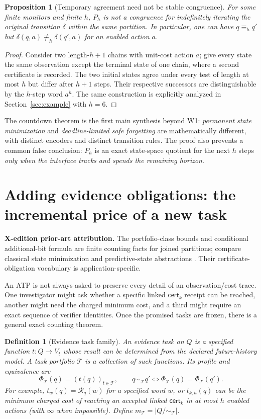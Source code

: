 \documentclass[11pt,letterpaper]{article}
\newcommand{\PriorArtNote}[1]{%
\par\smallskip\noindent\begin{minipage}{\linewidth}\small\color{black!85}%
\textbf{X-edition prior-art attribution.} #1\end{minipage}\par\smallskip}
\newtheorem{proposition}[theorem]{Proposition}
\newtheorem{definition}[theorem]{Definition}
\newcommand{\calT}{\mathcal{T}}
\newcommand{\cert}{\mathsf{cert}}
\newcommand{\R}{\mathcal{R}}
\newcommand{\eqk}[1]{\equiv_{#1}}
\begin{document}
\begin{proposition}[Temporary agreement need not be stable congruence]\label{prop:noncong}
For some finite monitors and finite $h$, $P_h$ is not a congruence for indefinitely iterating the original transition $\delta$ within the \emph{same} partition. In particular, one can have $q\eqk{h}q'$ but $\delta(q,a)\not\eqk{h}\delta(q',a)$ for an enabled action $a$.
\end{proposition}
\begin{proof}
Consider two length-$h+1$ chains with unit-cost action $a$; give every state the same observation except the terminal state of one chain, where a second certificate is recorded. The two initial states agree under every test of length at most $h$ but differ after $h+1$ steps. Their respective successors are distinguishable by the $h$-step word $a^h$. The same construction is explicitly analyzed in Section~\ref{sec:example} with $h=6$.
\end{proof}

The countdown theorem is the first main synthesis beyond W1: \emph{permanent state minimization} and \emph{deadline-limited safe forgetting} are mathematically different, with distinct encoders and distinct transition rules. The proof also prevents a common false conclusion: $P_h$ is an exact state-space quotient for the next $h$ steps \emph{only when the interface tracks and spends the remaining horizon}.

\section{Adding evidence obligations: the incremental price of a new task}
\PriorArtNote{The portfolio-class bounds and conditional additional-bit formula are finite counting facts for joined partitions; compare classical state minimization and predictive-state abstractions \cite{nerode,shalizi}. Their certificate-obligation vocabulary is application-specific.}
An ATP is not always asked to preserve every detail of an observation/cost trace. One investigator might ask whether a specific linked $\cert_k$ receipt can be reached, another might need the charged minimum cost, and a third might require an exact sequence of verifier identities. Once the promised tasks are frozen, there is a general exact counting theorem.

\begin{definition}[Evidence task family]\label{def:tasks}
An \emph{evidence task} on $Q$ is a specified function $t:Q\to V_t$ whose result can be determined from the declared future-history model. A \emph{task portfolio} $\calT$ is a collection of such functions. Its \emph{profile} and equivalence are
\[
\Phi_{\calT}(q)=(t(q))_{t\in\calT},\qquad
q\sim_{\calT}q'\iff \Phi_{\calT}(q)=\Phi_{\calT}(q').
\]
For example, $t_w(q)=\R_q(w)$ for a specified word $w$, or $t_{k,h}(q)$ can be the minimum charged cost of reaching an accepted linked $\cert_k$ in at most $h$ enabled actions (with $\infty$ when impossible). Define $m_{\calT}=|Q/\sim_{\calT}|$.
\end{definition}
\end{document}
